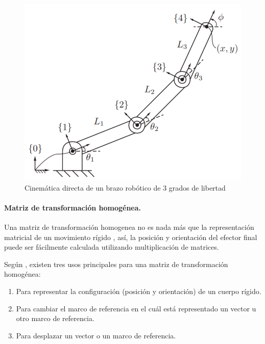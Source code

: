 \begin{figure}
    \centering
    \includegraphics[scale=0.6]{./img/chapter3/forwardkinematic.png}
    \caption{Cinemática directa de un brazo robótico de 3 grados de libertad \cite{University2017}}
    \label{fig:forwardkinematic2}
\end{figure}

\paragraph{Matriz de transformación homogénea.}

Una matriz de transformación homogenea no es nada más que la representación matricial de un movimiento rígido \cite{Spong2005}, así, la posición y orientación del efector final puede ser fácilmente calculada utilizando multiplicación de matrices.


Según \cite{University2017}, existen tres usos principales para una matriz de transformación homogénea:

\begin{enumerate}
\itemsep0em
  \item Para representar la configuración (posición y orientación) de un cuerpo rígido.
  \item Para cambiar el marco de referencia en el cuál está representado un vector u otro marco de referencia.
  \item Para desplazar un vector o un marco de referencia.
\end{enumerate}


